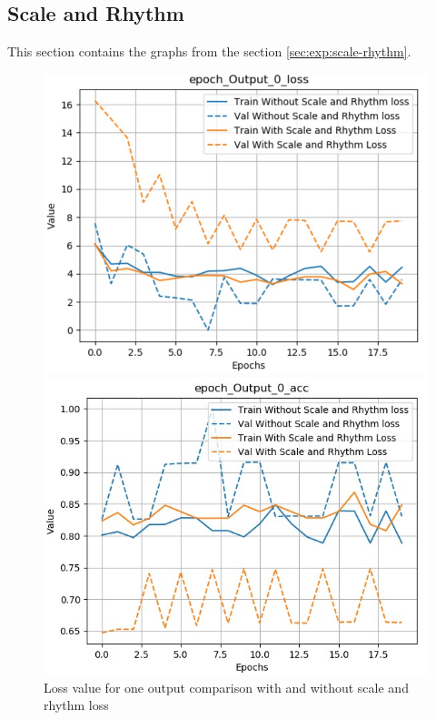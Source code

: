 \documentclass[12pt]{report}
\begin{document}
\subsection{Scale and Rhythm}
\label{appendix:scale-rhythm}

This section contains the graphs from the section \ref{sec:exp:scale-rhythm}.

\begin{figure}[htbp]
    \begin{minipage}{0.5\textwidth}
        \begin{center}
            \includegraphics[width=\textwidth]{images/experiences/scale-rhythm-rnn/loss-output-comparison-scale-rhythm.jpg}
            \caption{Loss value for one output comparison with and without scale and rhythm loss}
            \label{fig:exp:scale-rhythm:loss-output-comparison}
        \end{center}
    \end{minipage} \hfill
    \begin{minipage}{0.5 \textwidth}
        \begin{center}
            \includegraphics[width=\textwidth]{images/experiences/scale-rhythm-rnn/acc-output-comparison-scale-rhythm.jpg}

\end{center}
\end{minipage}
\end{figure}
\end{document}
